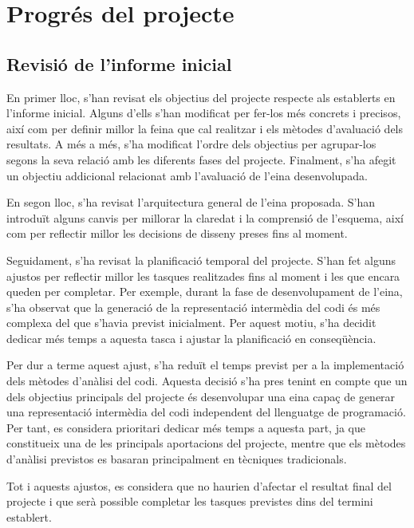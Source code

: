 \section*{Progrés del projecte}

\subsection*{Revisió de l'informe inicial}

En primer lloc, s'han revisat els objectius del projecte respecte als establerts en l'informe inicial. Alguns d'ells s'han modificat per fer-los més concrets i precisos, així com per definir millor la feina que cal realitzar i els mètodes d'avaluació dels resultats. A més a més, s'ha modificat l'ordre dels objectius per agrupar-los segons la seva relació amb les diferents fases del projecte. Finalment, s'ha afegit un objectiu addicional relacionat amb l'avaluació de l'eina desenvolupada.

En segon lloc, s'ha revisat l'arquitectura general de l'eina proposada. S'han introduït alguns canvis per millorar la claredat i la comprensió de l'esquema, així com per reflectir millor les decisions de disseny preses fins al moment.

Seguidament, s'ha revisat la planificació temporal del projecte. S'han fet alguns ajustos per reflectir millor les tasques realitzades fins al moment i les que encara queden per completar. Per exemple, durant la fase de desenvolupament de l'eina, s'ha observat que la generació de la representació intermèdia del codi és més complexa del que s'havia previst inicialment. Per aquest motiu, s'ha decidit dedicar més temps a aquesta tasca i ajustar la planificació en conseqüència.

Per dur a terme aquest ajust, s'ha reduït el temps previst per a la implementació dels mètodes d'anàlisi del codi. Aquesta decisió s'ha pres tenint en compte que un dels objectius principals del projecte és desenvolupar una eina capaç de generar una representació intermèdia del codi independent del llenguatge de programació. Per tant, es considera prioritari dedicar més temps a aquesta part, ja que constitueix una de les principals aportacions del projecte, mentre que els mètodes d'anàlisi previstos es basaran principalment en tècniques tradicionals.

Tot i aquests ajustos, es considera que no haurien d'afectar el resultat final del projecte i que serà possible completar les tasques previstes dins del termini establert.

